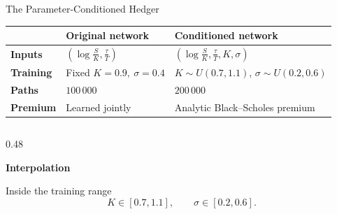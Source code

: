 \begin{frame}[t]{The Parameter-Conditioned Hedger}

\vspace{-0.18cm}


\begin{center}

\renewcommand{\arraystretch}{1.28}
\setlength{\tabcolsep}{8pt}

{\small
\begin{tabular}{
    p{}
    p{}
    p{}
}
\toprule
&
\textbf{Original network}
&
\textbf{Conditioned network}
\\
\midrule

\textbf{Inputs}
&
\(\displaystyle
\left(
\log\frac{S}{K},
\frac{\tau}{T}
\right)\)
&
\(\displaystyle
\left(
\log\frac{S}{K},
\frac{\tau}{T},
K,\sigma
\right)\)
\\

\textbf{Training}
&
Fixed \(K=0.9,\ \sigma=0.4\)
&
\(K\sim U(0.7,1.1)\),\quad
\(\sigma\sim U(0.2,0.6)\)
\\

\textbf{Paths}
&
\(100\,000\)
&
\(200\,000\)
\\

\textbf{Premium}
&
Learned jointly
&
Analytic Black--Scholes premium
\\

\bottomrule
\end{tabular}
}

\end{center}

\vspace{0.20cm}


\begin{columns}[T,onlytextwidth]

\begin{column}{0.48\textwidth}

\centering
{\small\bfseries Interpolation}

\vspace{0.07cm}

{\footnotesize
Inside the training range
\[
K\in[0.7,1.1],
\qquad
\sigma\in[0.2,0.6].
\]
}


\end{column}
\end{columns}
\end{frame}
